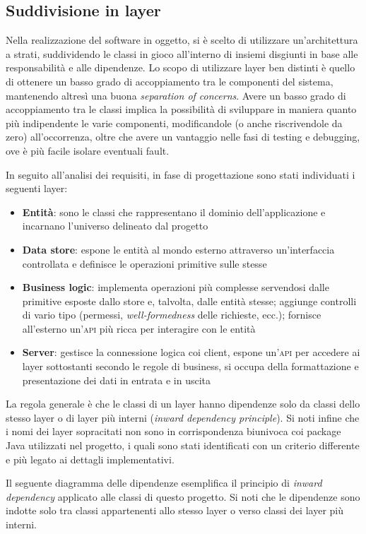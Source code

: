 \documentclass[a4paper,8pt]{article} %
\begin{document}
\subsection{Suddivisione in layer}
Nella realizzazione del software in oggetto, si è scelto di utilizzare un'architettura a strati, suddividendo le classi in gioco
all'interno di insiemi disgiunti in base alle responsabilità e alle dipendenze. Lo scopo di utilizzare layer ben distinti è quello
di ottenere un basso grado di accoppiamento tra le componenti del sistema, mantenendo altresì una buona  \emph{separation of concerns}.
Avere un basso grado di accoppiamento tra le classi implica la possibilità di sviluppare in maniera quanto più indipendente
le varie componenti, modificandole (o anche riscrivendole da zero) all'occorrenza, oltre che avere un vantaggio nelle fasi di testing e debugging, ove è
più facile isolare eventuali fault.
\par
In seguito all'analisi dei requisiti, in fase di progettazione sono stati individuati i seguenti layer:
\begin{itemize}
    \item \textbf{Entità}: sono le classi che rappresentano il dominio dell'applicazione e incarnano l'universo delineato dal progetto
    \item \textbf{Data store}: espone le entità al mondo esterno attraverso un'interfaccia controllata e definisce le operazioni primitive sulle stesse
    \item \textbf{Business logic}: implementa operazioni più complesse servendosi dalle primitive esposte dallo store e, talvolta, dalle entità stesse;
          aggiunge controlli di vario tipo (permessi, \emph{well-formedness} delle richieste, ecc.); fornisce all'esterno un'\textsc{api} più ricca per interagire con le entità
    \item \textbf{Server}: gestisce la connessione logica coi client, espone un'\textsc{api} per accedere ai layer sottostanti secondo le regole di business, si occupa della
          formattazione e presentazione dei dati in entrata e in uscita
\end{itemize}
La regola generale è che le classi di un layer hanno dipendenze solo da classi dello stesso layer o di layer più interni (\emph{inward dependency principle}).
Si noti infine che i nomi dei layer sopracitati non sono in corrispondenza biunivoca coi package Java utilizzati nel progetto, i quali sono stati
identificati con un criterio differente e più legato ai dettagli implementativi.
\par
Il seguente diagramma delle dipendenze esemplifica il principio di \emph{inward dependency} applicato alle classi di questo progetto. Si noti che le dipendenze sono indotte solo tra classi appartenenti allo stesso
layer o verso classi dei layer più interni.
\end{document}
